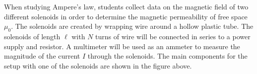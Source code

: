 \documentclass[12pt]{../../oss-apphys-exam}
\begin{document}
\begin{questions}
  

  
  
  \question When studying Ampere's law, students collect data on the magnetic
  field of two different solenoids in order to determine the magnetic
  permeability of free space $\mu_0$. The solenoids are created by wrapping
  wire around a hollow plastic tube. The solenoids of length $\ell$ with $N$
  turns of wire will be connected in series to a power supply and resistor. A
  multimeter will be used as an ammeter to measure the magnitude of the current
  $I$ through the solenoids. The main components for the setup with one of the
  solenoids are shown in the figure above.
\end{questions}
\end{document}
